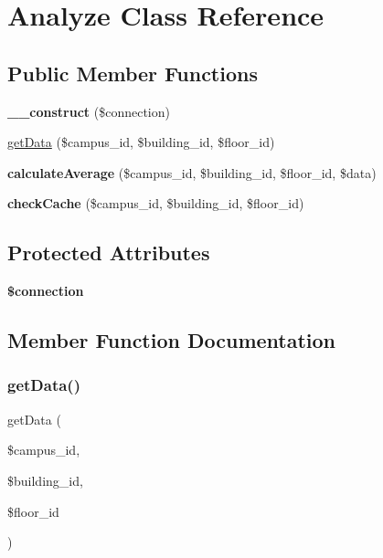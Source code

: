 \hypertarget{class_analyze}{}\section{Analyze Class Reference}
\label{class_analyze}
\subsection*{Public Member Functions}
\begin{DoxyCompactItemize}
\item 
\mbox{\label{class_analyze_a155afedbdfa01f1c0b813ca97642cdab}} 
{\bfseries \+\_\+\+\_\+construct} (\$connection)
\item 
\hyperlink{class_analyze_af5e2e7551c55064cb4e5d364eec9535a}{get\+Data} (\$campus\+\_\+id, \$building\+\_\+id, \$floor\+\_\+id)
\item 
\mbox{\label{class_analyze_aad0040b7a05fdb9aca1ec30bdc2d1b38}} 
{\bfseries calculate\+Average} (\$campus\+\_\+id, \$building\+\_\+id, \$floor\+\_\+id, \$data)
\item 
\mbox{\label{class_analyze_aab8309a23571a73077405957608a54f7}} 
{\bfseries check\+Cache} (\$campus\+\_\+id, \$building\+\_\+id, \$floor\+\_\+id)
\end{DoxyCompactItemize}
\subsection*{Protected Attributes}
\begin{DoxyCompactItemize}
\item 
\mbox{\label{class_analyze_a0d9c79b9b86b3f5891c6d3892f12c6a0}} 
{\bfseries \$connection}
\end{DoxyCompactItemize}


\subsection{Member Function Documentation}
\mbox{\label{class_analyze_af5e2e7551c55064cb4e5d364eec9535a}} 
\subsubsection{\texorpdfstring{get\+Data()}{getData()}}
{\footnotesize\ttfamily get\+Data (\begin{DoxyParamCaption}\item[{}]{\$campus\+\_\+id,  }\item[{}]{\$building\+\_\+id,  }\item[{}]{\$floor\+\_\+id }\end{DoxyParamCaption})}

